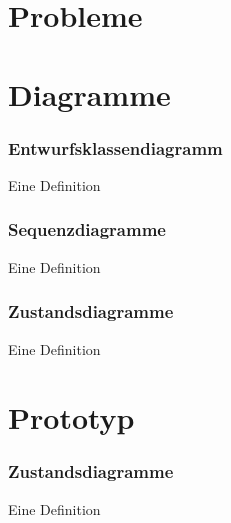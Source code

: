 \documentclass{beamer}
\begin{document}
\section{Probleme}

\section{Diagramme}
\begin{frame} %
  \frametitle{Entwurfsklassendiagramm} %
  \begin{Definition} %
    Eine Definition
  \end{Definition}
\end{frame}

\begin{frame} %
  \frametitle{Sequenzdiagramme} %
  \begin{Definition} %
    Eine Definition
  \end{Definition}
\end{frame}

\begin{frame} %
  \frametitle{Zustandsdiagramme} %
  \begin{Definition} %
    Eine Definition
  \end{Definition}
\end{frame}

\section{Prototyp}
\begin{frame} %
  \frametitle{Zustandsdiagramme} %
  \begin{Definition} %
    Eine Definition
  \end{Definition}
\end{frame}
\end{document}
